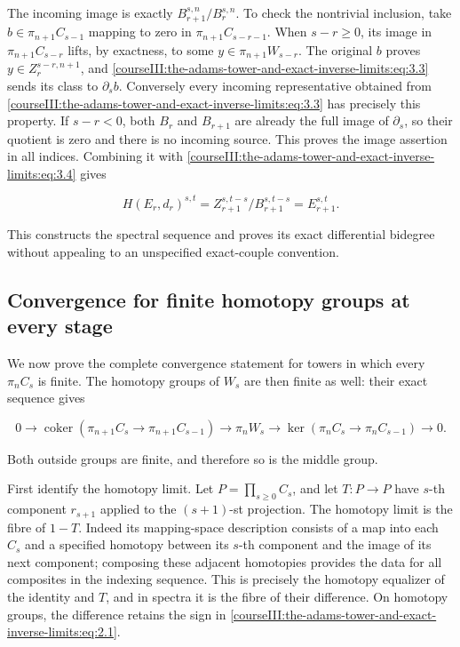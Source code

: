 The incoming image is exactly \(B_{r+1}^{s,n}/B_r^{s,n}\). To check the nontrivial inclusion, take
\(b\in\pi_{n+1}C_{s-1}\) mapping to zero in \(\pi_{n+1}C_{s-r-1}\).
When \(s-r\geq0\), its image in \(\pi_{n+1}C_{s-r}\) lifts, by exactness, to some
\(y\in\pi_{n+1}W_{s-r}\). The original \(b\) proves \(y\in Z_r^{s-r,n+1}\), and \eqref{courseIII:the-adams-tower-and-exact-inverse-limits:eq:3.3} sends its class to \(\partial_s b\). Conversely every incoming representative obtained from \eqref{courseIII:the-adams-tower-and-exact-inverse-limits:eq:3.3} has precisely this property. If \(s-r<0\), both \(B_r\) and \(B_{r+1}\) are already the full image of \(\partial_s\), so their quotient is zero and there is no incoming source. This proves the image assertion in all indices. Combining it with \eqref{courseIII:the-adams-tower-and-exact-inverse-limits:eq:3.4} gives

\begin{equation}
H(E_r,d_r)^{s,t}=Z_{r+1}^{s,t-s}/B_{r+1}^{s,t-s}=E_{r+1}^{s,t}.
 \label{courseIII:the-adams-tower-and-exact-inverse-limits:eq:3.5}
\end{equation}

This constructs the spectral sequence and proves its exact differential bidegree without appealing to an unspecified exact-couple convention.

\subsection{Convergence for finite homotopy groups at every stage}
\label{courseIII:the-adams-tower-and-exact-inverse-limits:adams-finite-convergence}

\label{courseIII:the-adams-tower-and-exact-inverse-limits:section-4}\label{courseIII:adams-tower:4}

We now prove the complete convergence statement for towers in which every \(\pi_nC_s\) is finite. The homotopy groups of \(W_s\) are then finite as well: their exact sequence gives

\begin{equation}
0\longrightarrow\operatorname{coker}(\pi_{n+1}C_s\to\pi_{n+1}C_{s-1})
 \longrightarrow\pi_nW_s
 \longrightarrow\ker(\pi_nC_s\to\pi_nC_{s-1})\longrightarrow0.
 \label{courseIII:the-adams-tower-and-exact-inverse-limits:eq:4.0}
\end{equation}

Both outside groups are finite, and therefore so is the middle group.

First identify the homotopy limit. Let \(P=\prod_{s\geq0}C_s\), and let \(T:P\to P\) have \(s\)-th component \(r_{s+1}\) applied to the \((s+1)\)-st projection. The homotopy limit is the fibre of \(1-T\). Indeed its mapping-space description consists of a map into each \(C_s\) and a specified homotopy between its \(s\)-th component and the image of its next component; composing these adjacent homotopies provides the data for all composites in the indexing sequence. This is precisely the homotopy equalizer of the identity and \(T\), and in spectra it is the fibre of their difference. On homotopy groups, the difference retains the sign in \eqref{courseIII:the-adams-tower-and-exact-inverse-limits:eq:2.1}.

